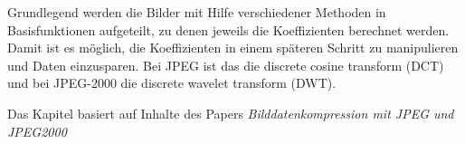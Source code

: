 Grundlegend werden die Bilder mit Hilfe verschiedener Methoden in Basisfunktionen aufgeteilt, zu denen jeweils die Koeffizienten berechnet werden.
Damit ist es möglich, die Koeffizienten in einem späteren Schritt zu manipulieren und Daten einzusparen. 
Bei JPEG ist das die discrete cosine transform (DCT) und bei JPEG-2000 die discrete wavelet transform (DWT).

Das Kapitel basiert auf Inhalte des Papers \textit{Bilddatenkompression mit JPEG und JPEG2000} \cite{jpeg:laurahochstrat}